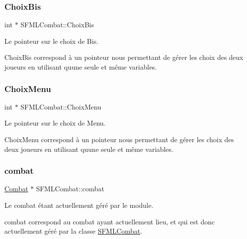 \subsubsection{\texorpdfstring{Choix\+Bis}{ChoixBis}}
{\footnotesize\ttfamily int $\ast$ S\+F\+M\+L\+Combat\+::\+Choix\+Bis\hspace{0.3cm}{\ttfamily [private]}}



Le pointeur sur le choix de Bis. 

Choix\+Bis correspond à un pointeur nous permettant de gérer les choix des deux joueurs en utilisant qu\textquotesingle{}une seule et même variables. \mbox{\label{class_s_f_m_l_combat_ac89c3f6d77a8238bf105586f861f1195}} 
\subsubsection{\texorpdfstring{Choix\+Menu}{ChoixMenu}}
{\footnotesize\ttfamily int $\ast$ S\+F\+M\+L\+Combat\+::\+Choix\+Menu\hspace{0.3cm}{\ttfamily [private]}}



Le pointeur sur le choix de Menu. 

Choix\+Menu correspond à un pointeur nous permettant de gérer les choix des deux joueurs en utilisant qu\textquotesingle{}une seule et même variables. \mbox{\label{class_s_f_m_l_combat_a3bddd4f06e74010cb91565b6b23a2f22}} 
\subsubsection{\texorpdfstring{combat}{combat}}
{\footnotesize\ttfamily \hyperlink{class_combat}{Combat} $\ast$ S\+F\+M\+L\+Combat\+::combat\hspace{0.3cm}{\ttfamily [private]}}



Le combat étant actuellement géré par le module. 

combat correspond au combat ayant actuellement lieu, et qui est donc actuellement géré par la classe \hyperlink{class_s_f_m_l_combat}{S\+F\+M\+L\+Combat}. \mbox{\label{class_s_f_m_l_combat_aad9f3c91f2ec93a927d14d21d18df8bf}} 

